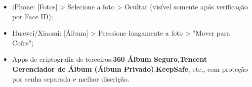 \begin{itemize}
  \item iPhone: [Fotos] > Selecione a foto > Ocultar (visível somente após verificação por Face ID);
  \item Huawei/Xiaomi: [Álbum] > Pressione longamente a foto > "Mover para Cofre";
  \item Apps de criptografia de terceiros:\textbf{360 Álbum Seguro},\textbf{Tencent Gerenciador de Álbum (Álbum Privado)},\textbf{KeepSafe}, etc., com proteção por senha separada e melhor discrição.
\end{itemize}
